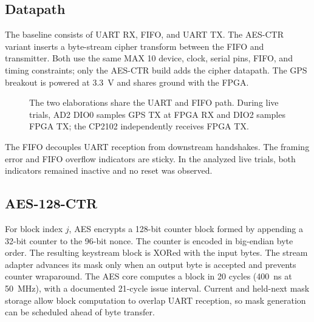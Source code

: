 \documentclass[runningheads]{llncs}
\begin{document}
\subsection{Datapath}
The baseline consists of UART RX, FIFO, and UART TX. The AES-CTR variant inserts a byte-stream cipher transform between the FIFO and transmitter. Both use the same MAX 10 device, clock, serial pins, FIFO, and timing constraints; only the AES-CTR build adds the cipher datapath. The GPS breakout is powered at 3.3~V and shares ground with the FPGA.

\begin{figure}[H]
\centering
{}
\caption{The two elaborations share the UART and FIFO path. During live trials, AD2 DIO0 samples GPS TX at FPGA RX and DIO2 samples FPGA TX; the CP2102 independently receives FPGA TX.}
\label{fig:architecture}
\end{figure}

The FIFO decouples UART reception from downstream handshakes. The framing error and FIFO overflow indicators are sticky. In the analyzed live trials, both indicators remained inactive and no reset was observed.

\subsection{AES-128-CTR}
For block index \(j\), AES encrypts a 128-bit counter block formed by appending a 32-bit counter to the 96-bit nonce. The counter is encoded in big-endian byte order. The resulting keystream block is XORed with the input bytes. The stream adapter advances its mask only when an output byte is accepted and prevents counter wraparound. The AES core computes a block in 20 cycles (400~ns at 50~MHz), with a documented 21-cycle issue interval. Current and held-next mask storage allow block computation to overlap UART reception, so mask generation can be scheduled ahead of byte transfer.
\end{document}
